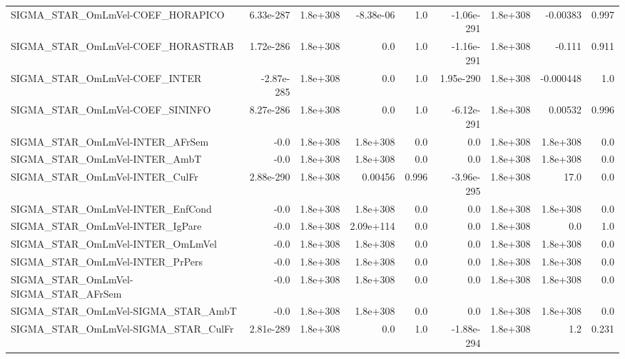 \begin{tabular}{lrrrrrrrr}
SIGMA\_STAR\_OmLmVel-COEF\_HORAPICO      &   6.33e-287 &     1.8e+308 &  -8.38e-06 &      1.0 & -1.06e-291 &    1.8e+308 &     -0.00383 &         0.997 \\
SIGMA\_STAR\_OmLmVel-COEF\_HORASTRAB     &   1.72e-286 &     1.8e+308 &        0.0 &      1.0 & -1.16e-291 &    1.8e+308 &       -0.111 &         0.911 \\
SIGMA\_STAR\_OmLmVel-COEF\_INTER         &  -2.87e-285 &     1.8e+308 &        0.0 &      1.0 &  1.95e-290 &    1.8e+308 &    -0.000448 &           1.0 \\
SIGMA\_STAR\_OmLmVel-COEF\_SININFO       &   8.27e-286 &     1.8e+308 &        0.0 &      1.0 & -6.12e-291 &    1.8e+308 &      0.00532 &         0.996 \\
SIGMA\_STAR\_OmLmVel-INTER\_AFrSem       &        -0.0 &     1.8e+308 &   1.8e+308 &      0.0 &        0.0 &    1.8e+308 &     1.8e+308 &           0.0 \\
SIGMA\_STAR\_OmLmVel-INTER\_AmbT         &        -0.0 &     1.8e+308 &   1.8e+308 &      0.0 &        0.0 &    1.8e+308 &     1.8e+308 &           0.0 \\
SIGMA\_STAR\_OmLmVel-INTER\_CulFr        &   2.88e-290 &     1.8e+308 &    0.00456 &    0.996 & -3.96e-295 &    1.8e+308 &         17.0 &           0.0 \\
SIGMA\_STAR\_OmLmVel-INTER\_EnfCond      &        -0.0 &     1.8e+308 &   1.8e+308 &      0.0 &        0.0 &    1.8e+308 &     1.8e+308 &           0.0 \\
SIGMA\_STAR\_OmLmVel-INTER\_IgPare       &        -0.0 &     1.8e+308 &  2.09e+114 &      0.0 &        0.0 &    1.8e+308 &          0.0 &           1.0 \\
SIGMA\_STAR\_OmLmVel-INTER\_OmLmVel      &        -0.0 &     1.8e+308 &   1.8e+308 &      0.0 &        0.0 &    1.8e+308 &     1.8e+308 &           0.0 \\
SIGMA\_STAR\_OmLmVel-INTER\_PrPers       &        -0.0 &     1.8e+308 &   1.8e+308 &      0.0 &        0.0 &    1.8e+308 &     1.8e+308 &           0.0 \\
SIGMA\_STAR\_OmLmVel-SIGMA\_STAR\_AFrSem  &        -0.0 &     1.8e+308 &   1.8e+308 &      0.0 &        0.0 &    1.8e+308 &     1.8e+308 &           0.0 \\
SIGMA\_STAR\_OmLmVel-SIGMA\_STAR\_AmbT    &        -0.0 &     1.8e+308 &   1.8e+308 &      0.0 &        0.0 &    1.8e+308 &     1.8e+308 &           0.0 \\
SIGMA\_STAR\_OmLmVel-SIGMA\_STAR\_CulFr   &   2.81e-289 &     1.8e+308 &        0.0 &      1.0 & -1.88e-294 &    1.8e+308 &          1.2 &         0.231 \\

\end{tabular}
